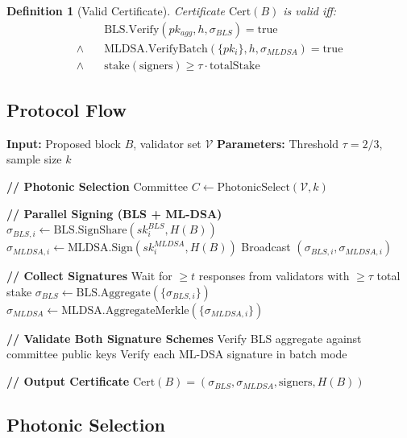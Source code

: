 \documentclass[11pt,a4paper]{article}
\newtheorem{definition}{Definition}
\begin{document}
\begin{definition}[Valid Certificate]
Certificate $\text{Cert}(B)$ is valid iff:
\begin{align}
&\text{BLS.Verify}(pk_{agg}, h, \sigma_{BLS}) = \text{true} \\
\land \quad &\text{MLDSA.VerifyBatch}(\{pk_i\}, h, \sigma_{MLDSA}) = \text{true} \\
\land \quad &\text{stake}(\text{signers}) \geq \tau \cdot \text{totalStake}
\end{align}
\end{definition}

\subsection{Protocol Flow}

\begin{algorithm}
\caption{Quasar Two-Round Finality}
\begin{algorithmic}[1]
\STATE \textbf{Input:} Proposed block $B$, validator set $\mathcal{V}$
\STATE \textbf{Parameters:} Threshold $\tau = 2/3$, sample size $k$

\STATE \textbf{// Photonic Selection}
\STATE Committee $C \gets \text{PhotonicSelect}(\mathcal{V}, k)$

\STATE \textbf{// Parallel Signing (BLS + ML-DSA)}
    \STATE $\sigma_{BLS,i} \gets \text{BLS.SignShare}(sk_i^{BLS}, H(B))$
    \STATE $\sigma_{MLDSA,i} \gets \text{MLDSA.Sign}(sk_i^{MLDSA}, H(B))$
    \STATE Broadcast $(\sigma_{BLS,i}, \sigma_{MLDSA,i})$
\ENDFOR

\STATE \textbf{// Collect Signatures}
\STATE Wait for $\geq t$ responses from validators with $\geq \tau$ total stake
\STATE $\sigma_{BLS} \gets \text{BLS.Aggregate}(\{\sigma_{BLS,i}\})$
\STATE $\sigma_{MLDSA} \gets \text{MLDSA.AggregateMerkle}(\{\sigma_{MLDSA,i}\})$

\STATE \textbf{// Validate Both Signature Schemes}
\STATE Verify BLS aggregate against committee public keys
\STATE Verify each ML-DSA signature in batch mode

\STATE \textbf{// Output Certificate}
\RETURN $\text{Cert}(B) = (\sigma_{BLS}, \sigma_{MLDSA}, \text{signers}, H(B))$
\end{algorithmic}
\end{algorithm}

\subsection{Photonic Selection}
\end{document}
